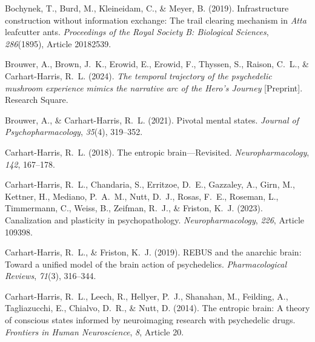 \documentclass[12pt,fleqn]{article}
\begin{document}
\begin{thebibliography}{}
  Bochynek, T., Burd, M., Kleineidam, C., \& Meyer, B. (2019).
  Infrastructure construction without information exchange: The trail clearing mechanism in \emph{Atta} leafcutter ants.
  \emph{Proceedings of the Royal Society B: Biological Sciences}, \emph{286}(1895), Article 20182539.

  Brouwer, A., Brown, J.~K., Erowid, E., Erowid, F., Thyssen, S., Raison, C.~L., \& Carhart-Harris, R.~L. (2024).
  \emph{The temporal trajectory of the psychedelic mushroom experience mimics the narrative arc of the Hero's Journey} [Preprint].
  Research Square.

  Brouwer, A., \& Carhart-Harris, R.~L. (2021).
  Pivotal mental states.
  \emph{Journal of Psychopharmacology}, \emph{35}(4), 319--352.

  Carhart-Harris, R.~L. (2018).
  The entropic brain---Revisited.
  \emph{Neuropharmacology}, \emph{142}, 167--178.

  Carhart-Harris, R.~L., Chandaria, S., Erritzoe, D.~E., Gazzaley, A., Girn, M., Kettner, H., Mediano, P.~A.~M., Nutt, D.~J., Rosas, F.~E., Roseman, L., Timmermann, C., Weiss, B., Zeifman, R.~J., \& Friston, K.~J. (2023).
  Canalization and plasticity in psychopathology.
  \emph{Neuropharmacology}, \emph{226}, Article 109398.

  Carhart-Harris, R.~L., \& Friston, K.~J. (2019).
  REBUS and the anarchic brain: Toward a unified model of the brain action of psychedelics.
  \emph{Pharmacological Reviews}, \emph{71}(3), 316--344.

  Carhart-Harris, R.~L., Leech, R., Hellyer, P.~J., Shanahan, M., Feilding, A., Tagliazucchi, E., Chialvo, D.~R., \& Nutt, D. (2014).
  The entropic brain: A theory of conscious states informed by neuroimaging research with psychedelic drugs.
  \emph{Frontiers in Human Neuroscience}, \emph{8}, Article 20.


\end{thebibliography}
\end{document}
